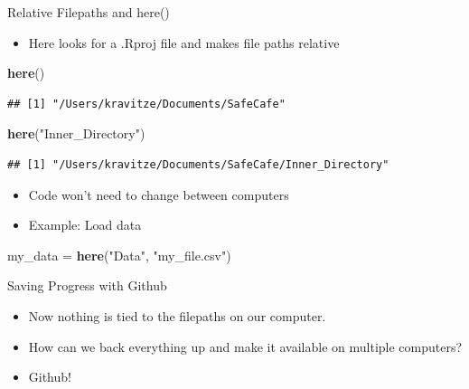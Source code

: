 \documentclass[ignorenonframetext,]{beamer}
\newenvironment{Shaded}{\begin{snugshade}}{\end{snugshade}}
\newcommand{\KeywordTok}[1]{\textcolor[rgb]{0.13,0.29,0.53}{\textbf{#1}}}
\newcommand{\NormalTok}[1]{#1}
\newcommand{\StringTok}[1]{\textcolor[rgb]{0.31,0.60,0.02}{#1}}
\providecommand{\tightlist}{%
  \setlength{\itemsep}{0pt}\setlength{\parskip}{0pt}}
\begin{document}
\begin{frame}[fragile]{Relative Filepaths and here()}
\protect\hypertarget{relative-filepaths-and-here-2}{}

\begin{itemize}
\tightlist
\item
  Here looks for a .Rproj file and makes file paths relative
\end{itemize}

\begin{Shaded}
\begin{Highlighting}[]
\KeywordTok{here}\NormalTok{()}
\end{Highlighting}
\end{Shaded}

\begin{verbatim}
## [1] "/Users/kravitze/Documents/SafeCafe"
\end{verbatim}

\begin{Shaded}
\begin{Highlighting}[]
\KeywordTok{here}\NormalTok{(}\StringTok{"Inner_Directory"}\NormalTok{)}
\end{Highlighting}
\end{Shaded}

\begin{verbatim}
## [1] "/Users/kravitze/Documents/SafeCafe/Inner_Directory"
\end{verbatim}

\begin{itemize}
\item
  Code won’t need to change between computers
\item
  Example: Load data
\end{itemize}

\begin{Shaded}
\begin{Highlighting}[]
\NormalTok{my_data =}\StringTok{ }\KeywordTok{here}\NormalTok{(}\StringTok{"Data"}\NormalTok{, }\StringTok{"my_file.csv"}\NormalTok{)}
\end{Highlighting}
\end{Shaded}

\end{frame}

\begin{frame}{Saving Progress with Github}
\protect\hypertarget{saving-progress-with-github}{}

\begin{itemize}
\item
  Now nothing is tied to the filepaths on our computer.
\item
  How can we \alert{back everything up} and
  \alert{make it available on multiple computers}?
\item
  Github!
\end{itemize}

\end{frame}
\end{document}
